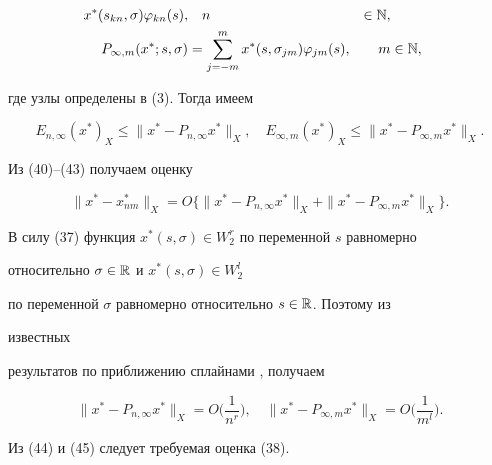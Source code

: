 \begin{pf}
\begin{alignat}{2}
x^*(s_{k n},\sigma)\varphi_{k n}(s), &\quad n&\in\Bbb N, \\ 


P_{\infty,m}(x^*;s,\sigma)&=\sum^m_{j=-m}x^*(s,\sigma_{j m}) 


\varphi_{j m}(s), &\quad m&\in\Bbb N, 


\end{alignat} 


где узлы определены в (3). Тогда имеем 


\begin{equation} 


E_{n,\infty}(x^*)_X\le \|x^*-P_{n,\infty}x^*\|_X,\quad 


E_{\infty,m}(x^*)_X\le \|x^*-P_{\infty,m}x^*\|_X. 


\end{equation} 


Из (40)--(43) получаем оценку 


\begin{equation} 


\|x^*-x^*_{nm}\|_X=O\{\|x^*-P_{n,\infty}x^*\|_X+ 


\|x^*-P_{\infty,m}x^*\|_X\}. 


\end{equation} 


 


В силу (37) функция $x^*(s,\sigma)\in W^r_2$ по переменной $s$ равномерно 


относительно $\sigma\in\Bbb R$ и $x^*(s,\sigma)\in W^l_2$ 


по переменной $\sigma$ равномерно относительно $s\in\Bbb R$. Поэтому из 


известных 


результатов по приближению сплайнами \cite{11}, \cite{12} получаем 


\begin{equation} 


\|x^*-P_{n,\infty}x^*\|_X=O 


\bigg(\frac{1}{n^r} \bigg),\quad 


\|x^*-P_{\infty,m}x^*\|_X=O\bigg(\frac{1}{m^l} \bigg). 


\end{equation} 


Из (44) и (45) следует требуемая оценка (38). 


\end{pf} 


 


